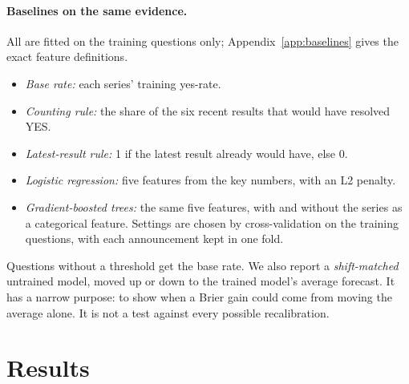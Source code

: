 \documentclass[11pt]{article}
\begin{document}
\paragraph{Baselines on the same evidence.} All are fitted on the training questions only; Appendix~\ref{app:baselines} gives the exact feature definitions.
\begin{itemize}[leftmargin=*]
\item \emph{Base rate:} each series' training yes-rate.
\item \emph{Counting rule:} the share of the six recent results that would have resolved YES.
\item \emph{Latest-result rule:} 1 if the latest result already would have, else 0.
\item \emph{Logistic regression:} five features from the key numbers, with an L2 penalty.
\item \emph{Gradient-boosted trees:} the same five features, with and without the series as a categorical feature. Settings are chosen by cross-validation on the training questions, with each announcement kept in one fold.
\end{itemize}
Questions without a threshold get the base rate. We also report a \emph{shift-matched} untrained model, moved up or down to the trained model's average forecast. It has a narrow purpose: to show when a Brier gain could come from moving the average alone. It is not a test against every possible recalibration.

\section{Results}
\end{document}
